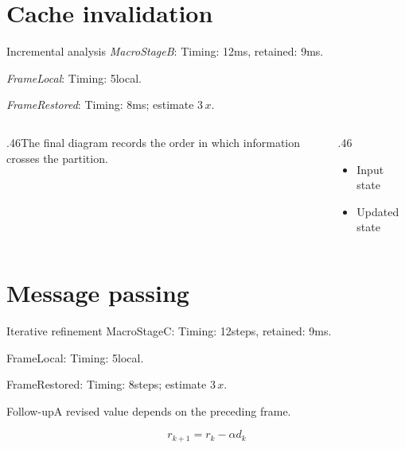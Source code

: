 \documentclass[9pt,aspectratio=43]{beamer}
\newcommand{\fuzzlayerA}[1]{\textit{#1}}
\newcommand{\fuzzlayerB}[1]{\fuzzlayerA{#1}}
\newcommand{\fuzzterm}[1]{\fuzzlayerB{#1}}
\newcommand{\fuzzpair}[2]{\fuzzterm{#1}: #2}
\newcommand{\fuzzunit}{ms}
\let\fuzzoriginalunit\fuzzunit
\newcommand{\fuzzcoefficient}{3}
\newcommand{\fuzzscale}[2][\fuzzcoefficient]{#1\,#2}
\begin{document}
\section{Cache invalidation}
\begin{frame}[t]{Incremental analysis}
\fuzzpair{MacroStageB}{Timing: 12\fuzzunit, retained: 9\fuzzoriginalunit.}\par
{\renewcommand{\fuzzunit}{local}\fuzzpair{FrameLocal}{Timing: 5\fuzzunit.}\par}
\fuzzpair{FrameRestored}{Timing: 8\fuzzunit; estimate $\fuzzscale{x}$.}\par
\begin{columns}[T]\begin{column}{.46\textwidth}The final diagram records the order in which information crosses the partition.\end{column}\begin{column}{.46\textwidth}\begin{itemize}\item Input state\item Updated state\end{itemize}\end{column}\end{columns}
\end{frame}
\renewcommand{\fuzzunit}{steps}
\renewcommand{\fuzzcoefficient}{3}
\renewcommand{\fuzzterm}[1]{{\textrm{#1}}}
\section{Message passing}
\begin{frame}[t]{Iterative refinement}
\fuzzpair{MacroStageC}{Timing: 12\fuzzunit, retained: 9\fuzzoriginalunit.}\par
{\renewcommand{\fuzzunit}{local}\fuzzpair{FrameLocal}{Timing: 5\fuzzunit.}\par}
\fuzzpair{FrameRestored}{Timing: 8\fuzzunit; estimate $\fuzzscale{x}$.}\par
\begin{block}{Follow-up}\fuzzterm{A revised value} depends on the preceding frame.\end{block}
\[r_{k+1}=r_k-\alpha d_k\]
\end{frame}
\renewcommand{\fuzzunit}{Hz}
\renewcommand{\fuzzcoefficient}{4}
\renewcommand{\fuzzterm}[1]{{\textit{#1}}}
\end{document}
